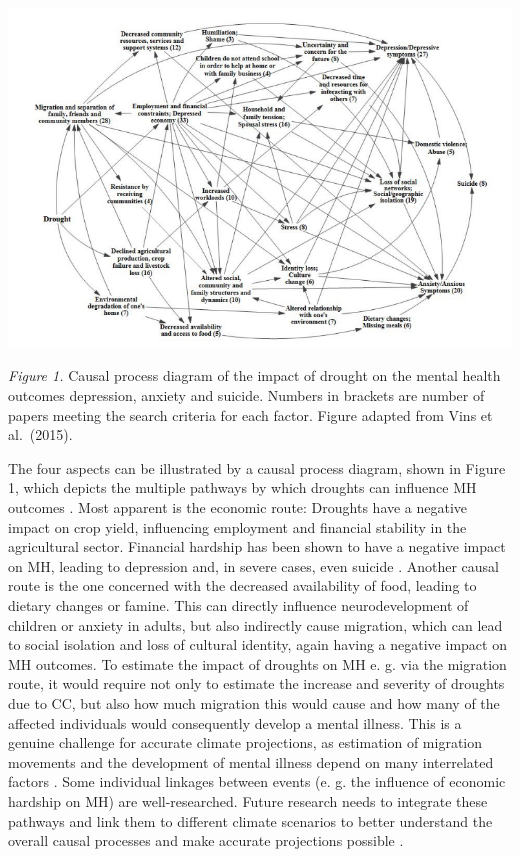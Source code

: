 \documentclass[
]{krantz}
\begin{document}
\begin{center}\includegraphics[width=0.8\linewidth]{work/12-mentalhealth/figures/drought_impact} \end{center}

\emph{Figure 1.} Causal process diagram of the impact of drought on the mental health outcomes depression, anxiety and suicide. Numbers in brackets are number of papers meeting the search criteria for each factor. Figure adapted from Vins et al.~(2015).

The four aspects can be illustrated by a causal process diagram, shown in Figure 1, which depicts the multiple pathways by which droughts can influence MH outcomes \citep{vinsMentalHealthOutcomes2015}. Most apparent is the economic route: Droughts have a negative impact on crop yield, influencing employment and financial stability in the agricultural sector. Financial hardship has been shown to have a negative impact on MH, leading to depression and, in severe cases, even suicide \citep[\citet{edwardsImpactDroughtMental2015}]{carletonCropdamagingTemperaturesIncrease2017}. Another causal route is the one concerned with the decreased availability of food, leading to dietary changes or famine. This can directly influence neurodevelopment of children or anxiety in adults, but also indirectly cause migration, which can lead to social isolation and loss of cultural identity, again having a negative impact on MH outcomes. To estimate the impact of droughts on MH e. g. via the migration route, it would require not only to estimate the increase and severity of droughts due to CC, but also how much migration this would cause and how many of the affected individuals would consequently develop a mental illness. This is a genuine challenge for accurate climate projections, as estimation of migration movements and the development of mental illness depend on many interrelated factors \citep{mazhinMigrationHealthCrisis2020}. Some individual linkages between events (e. g. the influence of economic hardship on MH) are well-researched. Future research needs to integrate these pathways and link them to different climate scenarios to better understand the overall causal processes and make accurate projections possible \citep{vinsMentalHealthOutcomes2015}.
\end{document}
